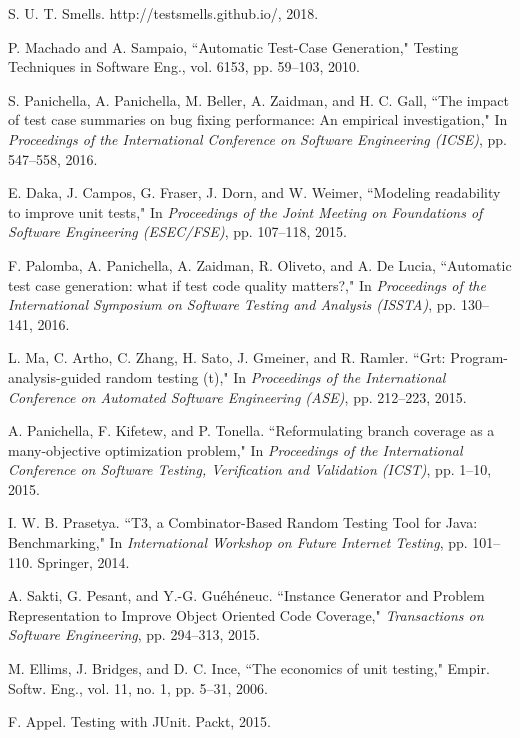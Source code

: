 \documentclass[conference]{IEEEtran}
\begin{document}
\begin{thebibliography}{15}
 S. U. T. Smells. http://testsmells.github.io/, 2018.



 P. Machado and A. Sampaio, ``Automatic Test-Case Generation," Testing Techniques in Software Eng., vol. 6153, pp. 59--103, 2010. 

 S. Panichella, A. Panichella, M. Beller, A. Zaidman, and H. C. Gall, ``The impact of test case summaries on bug fixing performance: An empirical investigation," In {\it Proceedings of the International Conference on Software Engineering (ICSE)}, pp. 547--558, 2016.

 E. Daka, J. Campos, G. Fraser, J. Dorn, and W. Weimer, ``Modeling readability to improve unit tests," In {\it Proceedings of the Joint Meeting on Foundations of Software Engineering (ESEC/FSE)}, pp. 107--118, 2015.

 F. Palomba, A. Panichella, A. Zaidman, R. Oliveto, and A. De Lucia, ``Automatic test case generation: what if test code quality matters?," In {\it Proceedings of the International Symposium on Software Testing and Analysis (ISSTA)}, pp. 130--141, 2016.

 L. Ma, C. Artho, C. Zhang, H. Sato, J. Gmeiner, and R. Ramler. ``Grt: Program-analysis-guided random testing (t)," In {\it Proceedings of the International Conference on Automated Software Engineering (ASE)}, pp. 212--223, 2015.

 A. Panichella, F. Kifetew, and P. Tonella. ``Reformulating branch coverage as a many-objective optimization problem," In {\it Proceedings of the International Conference on Software Testing, Verification and Validation (ICST)}, pp. 1--10, 2015. 

 I. W. B. Prasetya. ``T3, a Combinator-Based Random Testing Tool for Java: Benchmarking," In {\it International Workshop on Future Internet Testing}, pp. 101--110. Springer, 2014.

 A. Sakti, G. Pesant, and Y.-G. Gu\'{e}h\'{e}neuc. ``Instance Generator and Problem Representation to Improve Object Oriented Code Coverage," {\it Transactions on Software Engineering}, pp. 294--313, 2015.

 M. Ellims, J. Bridges, and D. C. Ince, ``The economics of unit testing," Empir. Softw. Eng., vol. 11, no. 1, pp. 5--31, 2006.

 F. Appel. Testing with JUnit. Packt, 2015.

\end{thebibliography}

\end{document}
